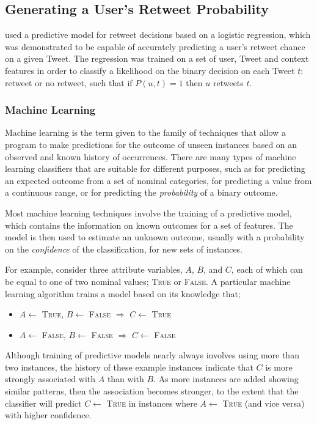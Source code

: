 \subsection{Generating a User's Retweet Probability} 
\cite{zhu11} used a predictive model for retweet decisions based on a logistic regression, which was demonstrated to be capable of accurately predicting a user's retweet chance on a given Tweet. The regression was trained on a set of user, Tweet and context features in order to classify a likelihood on the binary decision on each Tweet $t$: retweet or no retweet, such that if $P(u,t) = 1$ then $u$ retweets $t$.


\subsubsection{Machine Learning}
Machine learning is the term given to the family of techniques that allow a program to make predictions for the outcome of unseen instances based on an observed and known history of occurrences. There are many types of machine learning classifiers that are suitable for different purposes, such as for predicting an expected outcome from a set of nominal categories, for predicting a value from a continuous range, or for predicting the \textit{probability} of a binary outcome.

Most machine learning techniques involve the training of a predictive model, which contains the information on known outcomes for a set of features. The model is then used to estimate an unknown outcome, usually with a probability on the \textit{confidence} of the classification, for new sets of instances.

For example, consider three attribute variables, $A$, $B$, and $C$, each of which can be equal to one of two nominal values; \textsc{True} or \textsc{False}. A particular machine learning algorithm trains a model based on its knowledge that;
\begin{itemize}
    \item $A\gets$ \textsc{True}, $B\gets$ \textsc{False} $\Longrightarrow$ $C\gets$ \textsc{True}
    \item $A\gets$ \textsc{False}, $B\gets$ \textsc{False} $\Longrightarrow$ $C\gets$ \textsc{False}
\end{itemize}
Although training of predictive models nearly always involves using more than two instances, the history of these example instances indicate that $C$ is more strongly associated with $A$ than with $B$. As more instances are added showing similar patterns, then the association becomes stronger, to the extent that the classifier will predict $C\gets$ \textsc{True} in instances where $A\gets$ \textsc{True} (and vice versa) with higher confidence.

